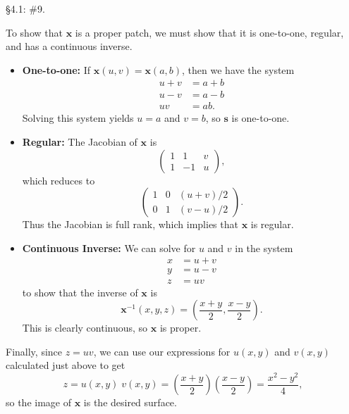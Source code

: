 \documentclass[10pt]{report}
\begin{document}
\begin{exer}[]
\S 4.1: \#9.
\end{exer}
To show that $\mathbf{x}$ is a proper patch, we must show that it is one-to-one, regular, and has a continuous inverse.
\begin{itemize}
	\item \textbf{One-to-one:} If $\mathbf{x}(u,v) = \mathbf{x}(a,b)$, then we have the system
		\begin{align*}
			u+v&=a+b \\
			u-v&=a-b \\
			uv&=ab.
		\end{align*}
		Solving this system yields $u=a$ and $v=b$, so $\mathbf{s}$ is one-to-one.
	\item \textbf{Regular:} The Jacobian of $\mathbf{x}$ is
		\[
		\begin{pmatrix}
			1&1&v \\
			1&-1&u
		\end{pmatrix},
		\] 
		which reduces to
		\[
		\begin{pmatrix}
			1 & 0 & (u+v)/2 \\
			0&1&(v-u)/2
		\end{pmatrix}.
		\] 
		Thus the Jacobian is full rank, which implies that $\mathbf{x}$ is regular.
	\item \textbf{Continuous Inverse:} We can solve for $u$ and $v$ in the system
		\begin{align*}
			x&=u+v \\
			y&=u-v\\
			z&=uv
		\end{align*}
		to show that the inverse of $\mathbf{x}$ is
		\[
			\mathbf{x}^{-1}(x,y,z) = \left( \frac{x+y}{2} ,\frac{x-y}{2}  \right).
		\] 
		This is clearly continuous, so $\mathbf{x}$ is proper.
\end{itemize}

Finally, since $z=uv$, we can use our expressions for $u(x,y)$ and $v(x,y)$ calculated just above to get
\[
	z = u(x,y) \; v(x,y) = \left(\frac{x+y}{2}  \right)\left( \frac{x-y}{2}  \right) = \frac{x^2-y^2}{4} ,
\] so the image of $\mathbf{x}$ is the desired surface.
\end{document}
